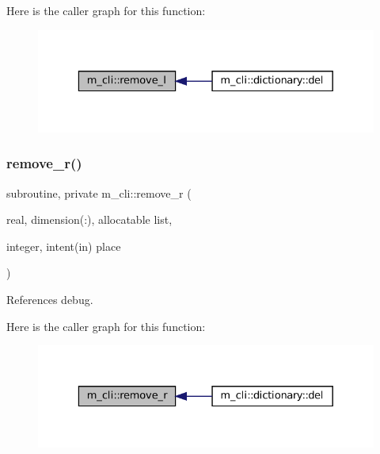 Here is the caller graph for this function\+:\nopagebreak
\begin{figure}[H]
\begin{center}
\leavevmode
\includegraphics[width=329pt]{namespacem__cli_a9c86f0f52ce71f14e774fd21f0686cf6_icgraph}
\end{center}
\end{figure}
\mbox{\label{namespacem__cli_a4f47701695b95c88fa4927c04996ce0f}} 
\subsubsection{\texorpdfstring{remove\+\_\+r()}{remove\_r()}}
{\footnotesize\ttfamily subroutine, private m\+\_\+cli\+::remove\+\_\+r (\begin{DoxyParamCaption}\item[{real, dimension(\+:), allocatable}]{list,  }\item[{integer, intent(in)}]{place }\end{DoxyParamCaption})\hspace{0.3cm}{\ttfamily [private]}}



References debug.

Here is the caller graph for this function\+:\nopagebreak
\begin{figure}[H]
\begin{center}
\leavevmode
\includegraphics[width=329pt]{namespacem__cli_a4f47701695b95c88fa4927c04996ce0f_icgraph}
\end{center}
\end{figure}
\mbox{\label{namespacem__cli_a785aa0016768b6dc2e27c29d5342c329}} 
